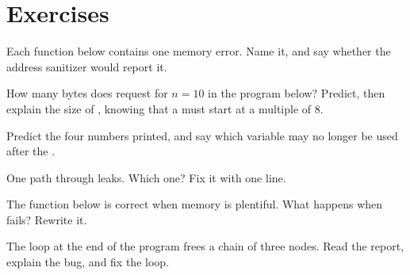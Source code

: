 \section{Exercises}\label{sec:b1:dynamic-memory:exercises}

\begin{exercise}[$\star$]\label{exo:b1:dynamic-memory:1}
Each function below contains one memory error. Name it, and say whether the address sanitizer would report it.
\end{exercise}

\begin{exercise}[$\star$]\label{exo:b1:dynamic-memory:2}
How many bytes does  request for $n = 10$ in the program below? Predict, then explain the
size of , knowing that a  must start at a multiple of 8.
\end{exercise}

\begin{exercise}[$\star$]\label{exo:b1:dynamic-memory:3}
Predict the four numbers printed, and say which variable may no longer be used after the .
\end{exercise}

\begin{exercise}[$\star$]\label{exo:b1:dynamic-memory:4}
One path through  leaks. Which one? Fix it with one line.
\end{exercise}

\begin{exercise}[$\star\star$]\label{exo:b1:dynamic-memory:5}
The function  below is correct when memory is plentiful. What happens when  fails? Rewrite it.
\end{exercise}

\begin{exercise}[$\star\star$]\label{exo:b1:dynamic-memory:6}
The loop at the end of the program frees a chain of three nodes. Read the report, explain the bug, and fix the loop.
\end{exercise}

